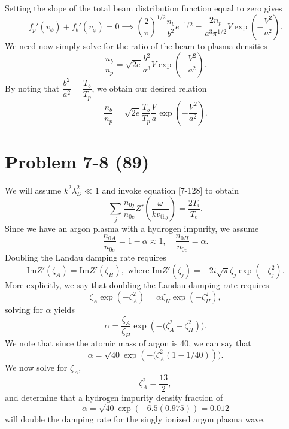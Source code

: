 Setting the slope of the total beam distribution function equal to zero gives
\begin{equation*}
	f_p'(v_\phi) + f_b'(v_\phi) = 0 \implies \left(\dfrac{2}{\pi}\right)^{1/2}\dfrac{n_b}{b^2}e^{-1/2} = \dfrac{2n_p}{a^3\pi^{1/2}}V\exp\left(-\dfrac{V^2}{a^2} \right).
\end{equation*}
We need now simply solve for the ratio of the beam to plasma densities
\begin{equation*}
	\dfrac{n_b}{n_p} = \sqrt{2e}\dfrac{b^2}{a^3}V\exp\left(-\dfrac{V^2}{a^2} \right).
\end{equation*}
By noting that \(\dfrac{b^2}{a^2} = \dfrac{T_b}{T_p} \), we obtain our desired relation
\begin{equation*}
	\dfrac{n_b}{n_p} = \sqrt{2e}\dfrac{T_b}{T_p}\dfrac{V}{a}\exp\left(-\dfrac{V^2}{a^2} \right).
\end{equation*}

\section*{Problem 7-8 (89)}
\label{sec:7-8}
We will assume \(k^2\lambda^2_D \ll 1 \) and invoke equation [7-128] to obtain
\begin{equation*}
	\sum_j\dfrac{n_{0j}}{n_{0e}}Z'\left(\dfrac{\omega}{kv_{\text{th}j}}\right) = \dfrac{2T_i}{T_e}.
\end{equation*}
Since we have an argon plasma with a hydrogen impurity, we assume
\begin{equation*}
	\dfrac{n_{0A}}{n_{0e}} = 1-\alpha \approx 1, \quad \dfrac{n_{0H}}{n_{0e}} = \alpha.
\end{equation*}
Doubling the Landau damping rate requires
\begin{equation*}
	\text{Im}Z'(\zeta_A) = \text{Im}Z'(\zeta_H), \text{ where } \text{Im}Z'(\zeta_j) = -2i\sqrt{\pi}\zeta_j\exp\left(-\zeta_j^2\right).
\end{equation*}
More explicitly, we say that doubling the Landau damping rate requires
\begin{equation*}
	\zeta_A\exp\left(-\zeta_A^2\right) = \alpha \zeta_H\exp\left(-\zeta_H^2\right),
\end{equation*}
solving for \(\alpha\) yields
\begin{equation*}
	\alpha = \dfrac{\zeta_A}{\zeta_H}\exp\left(-(\zeta_A^2 - \zeta_H^2\right)).
\end{equation*}
We note that since the atomic mass of argon is 40, we can say that
\begin{equation*}
\alpha = \sqrt{40}\exp\left(-(\zeta_A^2(1 - 1/40)\right)).
\end{equation*}
We now solve for \(\zeta_A \),
\begin{equation*}
	\zeta_A^2 = \dfrac{13}{2},
\end{equation*}
and determine that a hydrogen impurity density fraction of 
\begin{equation*}
	\alpha = \sqrt{40}\exp(-6.5(0.975)) = 0.012
\end{equation*}
will double the damping rate for the singly ionized argon plasma wave.


